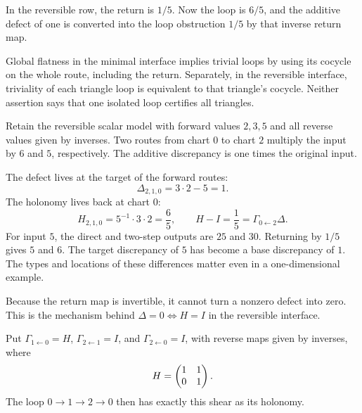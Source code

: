 In the reversible row, the return is $1/5$. Now the loop is $6/5$, and the additive defect of one is converted into the loop obstruction $1/5$ by that inverse return map.

Global flatness in the minimal interface implies trivial loops by using its cocycle on the whole route, including the return. Separately, in the reversible interface, triviality of each triangle loop is equivalent to that triangle's cocycle. Neither assertion says that one isolated loop certifies all triangles.


Retain the reversible scalar model with forward values $2,3,5$ and all reverse values given by inverses. Two routes from chart $0$ to chart $2$ multiply the input by $6$ and $5$, respectively. The additive discrepancy is one times the original input.


The defect lives at the target of the forward routes:
\[
\Delta_{2,1,0}=3\cdot2-5=1.
\]
The holonomy lives back at chart $0$:
\[
H_{2,1,0}=5^{-1}\cdot3\cdot2=\frac65,
\qquad H-I=\frac15=\Gamma_{0\leftarrow2}\Delta.
\]
For input $5$, the direct and two-step outputs are $25$ and $30$. Returning by $1/5$ gives $5$ and $6$. The target discrepancy of $5$ has become a base discrepancy of $1$. The types and locations of these differences matter even in a one-dimensional example.

Because the return map is invertible, it cannot turn a nonzero defect into zero. This is the mechanism behind $\Delta=0\Longleftrightarrow H=I$ in the reversible interface.


Put $\Gamma_{1\leftarrow0}=H$, $\Gamma_{2\leftarrow1}=I$, and $\Gamma_{2\leftarrow0}=I$, with reverse maps given by inverses, where
\[
H=\begin{pmatrix}1&1\\0&1\end{pmatrix}.
\]
The loop $0\to1\to2\to0$ then has exactly this shear as its holonomy.

